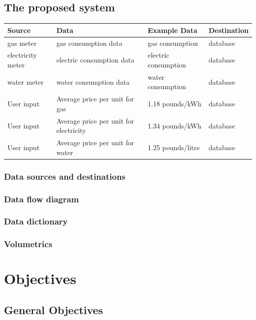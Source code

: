 \subsection{The proposed system}
\begin{center}
\begin{tabular}{|l|l|l|l|}
	\hline
	\textbf{Source} & \textbf{Data} & \textbf{Example Data} & \textbf{Destination} \\ \hline
	gas meter & gas consumption data & gas consumption & database \\ \hline
 	electricity meter & electric consumption data & electric consumption & database \\ \hline
	water meter & water consumption data & water consumption & database \\ \hline
	User input & Average price per unit for gas & 1.18 pounds/kWh & database \\ \hline
 	User input & Average price per unit for electricity & 1.34 pounds/kWh & database \\ \hline
	User input & Average price per unit for water & 1.25 pounds/litre & database \\ \hline
\end{tabular}
\label{tab:Data sources and destinations for the proposed system}
\end{center}

\subsubsection{Data sources and destinations}

\subsubsection{Data flow diagram}

\subsubsection{Data dictionary}

\subsubsection{Volumetrics}

\section{Objectives}

\subsection{General Objectives}

